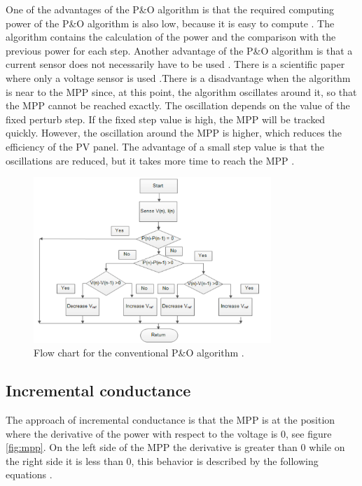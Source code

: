 One of the advantages of the P\&O algorithm is that the required computing power of the P\&O algorithm is also low, because it is easy to compute . The algorithm contains the calculation of the power and the comparison with the previous power for each step. Another advantage of the P\&O algorithm is that a current sensor does not necessarily have to be used  . There is a scientific paper where only a voltage sensor is used \cite{withoutcurrent}.There is a disadvantage when the algorithm is near to the MPP since, at this point, the algorithm oscillates around it, so that the MPP cannot be reached exactly. The oscillation depends on the value of the fixed perturb step. If the fixed step value is high, the MPP will be tracked quickly. However, the oscillation around the MPP is higher, which reduces the efficiency of the PV panel. The advantage of a small step value is that the oscillations are reduced, but it takes more time to reach the MPP \cite{AN1521_MC}. 

\begin{figure}[H]
	\begin{center}
		\includegraphics[width=0.8\textwidth]{../Pictures/P1/Flow_chart/flow_chart_perturb_observe}
		\caption{Flow chart for the conventional P\&O algorithm \cite{PerturbObserveFC}.}
		\label{fcperturbandobserve}
	\end{center}	
\end{figure}

\subsection{Incremental conductance}
The approach of incremental conductance is that the MPP is at the position where the derivative of the power with respect to the voltage is 0, see figure \ref{fig:mpp}. On the left side of the MPP the derivative is greater than 0 while on the right side it is less than 0, this behavior is described by the following equations \cite{AN1521_MC}.

